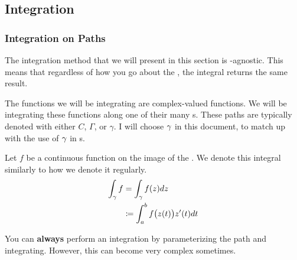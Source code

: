 \subsection{Integration}\label{subsec:Integration}
\subsubsection{Integration on Paths}\label{subsubsec:Integration_on_Paths}
The integration method that we will present in this section is -agnostic.
This means that regardless of how you go about  the , the integral returns the same result.

The functions we will be integrating are complex-valued functions.
We will be integrating these functions along one of their many s.
These paths are typically denoted with either $C$, $\Gamma$, or $\gamma$.
I will choose $\gamma$ in this document, to match up with the use of $\gamma$ in s.

\begin{definition}\label{def:Integration_on_Paths}
  Let $f$ be a continuous function on the image of the .
  We denote this integral similarly to how we denote it regularly.
  \begin{equation}\label{eq:Integration_on_Paths}
    \begin{aligned}
      \int_{\gamma} f &= \int_{\gamma} f(z) dz \\
      &\coloneqq \int_{a}^{b} f\bigl( z(t) \bigr) z'(t) dt
    \end{aligned}
  \end{equation}

  \begin{remark}
    You can \textbf{always} perform an integration by parameterizing the path and integrating.
    However, this can become very complex sometimes.
  \end{remark}
\end{definition}

